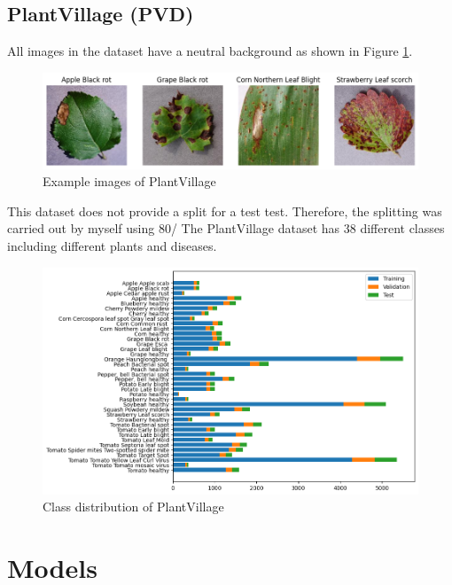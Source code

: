 \subsection{PlantVillage (PVD)}
All images in the dataset have a neutral background as shown in Figure \ref{fig:example_images_of_plantvillage}.

\begin{figure}[H]
    \begin{center}
    \includegraphics[width=15cm]{../images/example_images_of_plantvillage.png}
    \caption{Example images of PlantVillage}
    \label{fig:example_images_of_plantvillage}
    \end{center}
\end{figure}

This dataset does not provide a split for a test test. Therefore, the splitting was carried out by myself using 80/%
The PlantVillage dataset has 38 different classes including different plants and diseases. 

\begin{figure}[H]
    \begin{center}
    \includegraphics[width=15cm]{../images/class_distribution_of_plantvillage.png}
    \caption{Class distribution of PlantVillage}
    \label{fig:class_distribution_of_plantvillage}
    \end{center}
\end{figure}

\section{Models}
